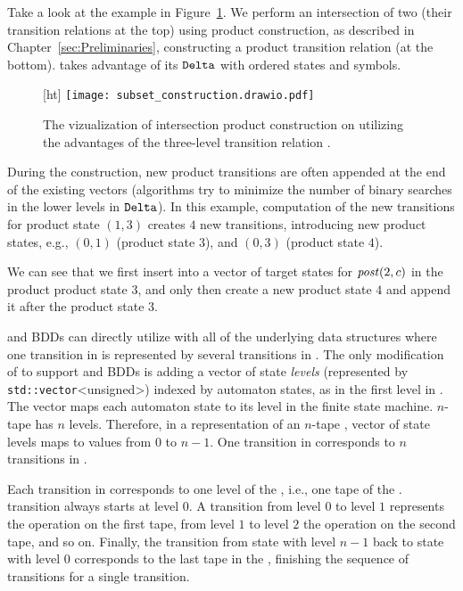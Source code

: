 \begin{example}
  Take a look at the example in Figure~\ref{fig:delta_struct_product_construction}.
  We perform an intersection of two \nfas (their transition relations at the top) using product construction, as described in Chapter~\ref{sec:Preliminaries}, constructing a product transition relation (at the bottom).
  \mata takes advantage of its $\mathtt{Delta}$ with ordered states and symbols.

  \begin{figure}
    [ht]
    \centering
  \texttt{[image: subset\_construction.drawio.pdf]}
  \caption{
  The vizualization of intersection product construction on \nfas utilizing the advantages of the three-level transition relation \deltastruct.
  }
  \label{fig:delta_struct_product_construction}
  \end{figure}

  During the construction, new product transitions are often appended at the end of the existing vectors (algorithms try to minimize the number of binary searches in the lower levels in $\mathtt{Delta}$).
  In this example, computation of the new transitions for product state $(1, 3)$ creates $4$ new transitions, introducing new product states, e.g., $(0, 1)$ (product state $3$), and $(0, 3)$ (product state $4$).

  We can see that we first insert into a vector of target states for $\mathit{post}(2, c)$ in the product product state $3$, and only then create a new product state $4$ and append it after the product state $3$.
\end{example}

\nfts and BDDs can directly utilize \nfaClass with all of the underlying data structures where one transition in \nft is represented by several transitions in \nfaClass.
The only modification of \nfaClass to support \nfts and BDDs is adding a vector of state \emph{levels} (represented by \texttt{std::vector}<unsigned>) indexed by automaton states, as in the first level in \deltastruct. The vector maps each automaton state to its level in the finite state machine.
$n$-tape \nft has $n$ levels.
Therefore, in a representation of an $n$-tape \nft, vector of state levels maps to values from $0$ to $n-1$.
One transition in \nft corresponds to $n$ transitions in \nfaClass.

Each transition in \nfaClass corresponds to one level of the \nft, i.e., one tape of the \nft.
\nft transition always starts at level $0$.
A transition from level $0$ to level $1$ represents the operation on the first \nft tape, from level $1$ to level $2$ the operation on the second \nft tape, and so on.
Finally, the transition from state with level $n-1$ back to state with level $0$ corresponds to the last tape in the \nft, finishing the sequence of \nfa transitions for a single \nft transition.

